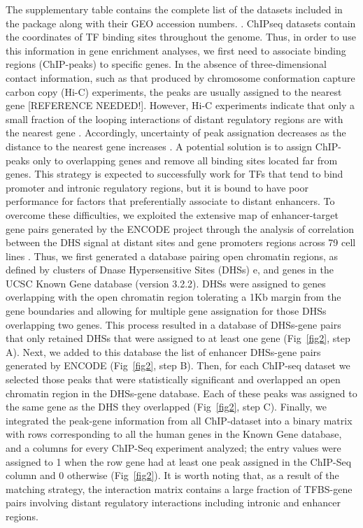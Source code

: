 \documentclass[10pt,letterpaper]{article}
\begin{document}
	The supplementary table  contains the complete list of the datasets included in the package along with their GEO accession numbers. .  
	ChIPseq datasets contain the coordinates of TF binding sites throughout the genome. Thus, in order to use this information in gene enrichment analyses, we first need to associate binding regions (ChIP-peaks) to specific genes. In the absence of three-dimensional contact information, such as that produced by chromosome conformation capture carbon copy (Hi-C) experiments, the peaks are usually assigned to the nearest gene [REFERENCE NEEDED!]. However, Hi-C experiments indicate that only a small fraction of the looping interactions of  distant regulatory regions are with the nearest gene \cite{Sanyal2012}. Accordingly, uncertainty of peak assignation decreases as the distance to the nearest gene increases \cite{Mifsud2015}. A potential solution is to assign ChIP-peaks only to overlapping genes and remove all binding sites located far from genes. This strategy is expected to successfully work for TFs that tend to bind  promoter and intronic regulatory regions, but it is bound to have poor performance for factors that preferentially associate to distant enhancers. To overcome these difficulties, we exploited the extensive map of enhancer-target gene pairs generated by the ENCODE project through the analysis of correlation between the DHS signal at distant sites and gene promoters regions across 79 cell lines \cite{Thurman2012}. Thus, we first generated a database pairing open chromatin regions, as defined by clusters of Dnase Hypersensitive Sites (DHSs) e\cite{EncodeDHS1}\cite{EncodeDHS2}, and genes in the UCSC Known Gene database (version 3.2.2)\cite{KnownGene}. DHSs were assigned to genes overlapping with the open chromatin region tolerating a 1Kb margin from the gene boundaries and allowing for multiple gene assignation for those DHSs overlapping two genes. This process resulted in a database of DHSs-gene pairs that only retained DHSs that were assigned to at least one gene (Fig~\ref{fig2}, step A). Next, we added to this database the list of enhancer DHSs-gene pairs generated by ENCODE \cite{Thurman2012} (Fig~\ref{fig2}, step B). Then, for each ChIP-seq dataset we selected those peaks that were statistically significant and overlapped an open chromatin region in the DHSs-gene database. Each of these peaks was assigned to the same gene as the DHS they overlapped (Fig~\ref{fig2}, step C). Finally, we integrated the peak-gene information from all ChIP-dataset into a binary matrix with rows corresponding to all the human genes in the Known Gene database, and a columns for every ChIP-Seq experiment analyzed; the entry values were assigned to 1 when the row gene had at least one peak assigned in the ChIP-Seq column and 0 otherwise (Fig~\ref{fig2}). It is worth noting that, as a result of the matching strategy, the interaction matrix contains a large fraction of TFBS-gene pairs involving distant regulatory interactions including intronic \cite{Mifsud2015} and enhancer regions.
	
\end{document}

